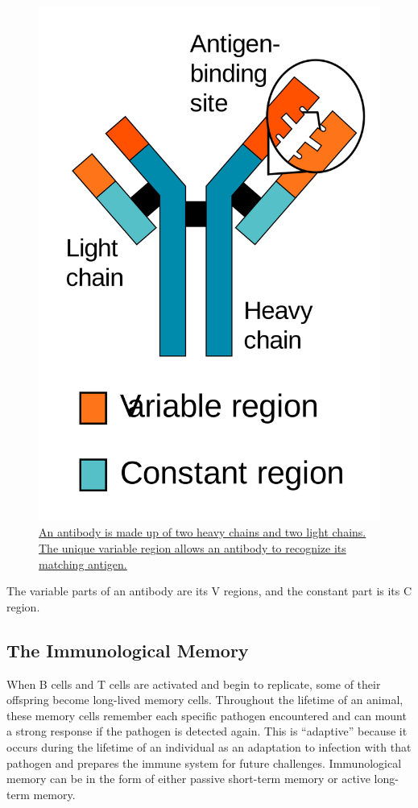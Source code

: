 \begin{figure}

{\centering \includegraphics[width=0.7\linewidth]{./figures/immune/Antibody_chains} 

}

\caption{\href{https://commons.wikimedia.org/wiki/File:Antibody_chains.svg}{An antibody is made up of two heavy chains and two light chains. The unique variable region allows an antibody to recognize its matching antigen.}}\label{fig:antibodystructure}
\end{figure}

The variable parts of an antibody are its V regions, and the constant part is its C region.

\hypertarget{the-immunological-memory}{%
\subsection{The Immunological Memory}\label{the-immunological-memory}}

When B cells and T cells are activated and begin to replicate, some of their offspring become long-lived memory cells. Throughout the lifetime of an animal, these memory cells remember each specific pathogen encountered and can mount a strong response if the pathogen is detected again. This is ``adaptive'' because it occurs during the lifetime of an individual as an adaptation to infection with that pathogen and prepares the immune system for future challenges. Immunological memory can be in the form of either passive short-term memory or active long-term memory.


